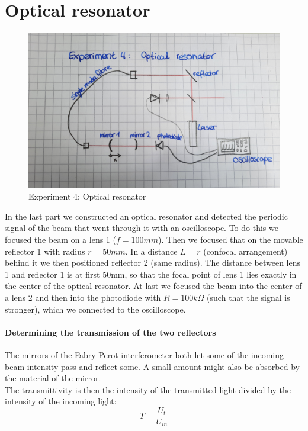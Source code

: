 \documentclass{article}
\begin{document}
\section{Optical resonator}

\begin{figure}[h!]
\includegraphics[width=\textwidth]{Tv4Aufbau.jpg}
\caption{Experiment 4: Optical resonator}
\label{TV4Aufbau}
\end{figure}

In the last part we constructed an optical resonator and detected the periodic signal of the beam that went through it with an oscilloscope. To do this we focused the beam on a lens 1 ($f=100mm$). Then we focused that on the movable reflector 1 with radius $r = 50mm$. In a distance $L=r$ (confocal arrangement) behind it we then positioned reflector 2 (same radius). The distance between lens 1 and reflector 1 is at first 50mm, so that the focal point of lens 1 lies exactly in the center of the optical resonator. At last we focused the beam into the center of a lens 2 and then into the photodiode with $R=100k\Omega$ (such that the signal is stronger), which we connected to the oscilloscope.

\paragraph{Determining the transmission of the two reflectors}
The mirrors of the Fabry-Perot-interferometer both let some of the incoming beam intensity pass and reflect some. A small amount might also be absorbed by the material of the mirror.\\

The transmittivity is then the intensity of the transmitted light divided by the intensity of the incoming light:
\begin{equation}
T = \frac{U_{t}}{U_{in}}
\label{transmittivitybyvoltage}
\end{equation}
\end{document}
